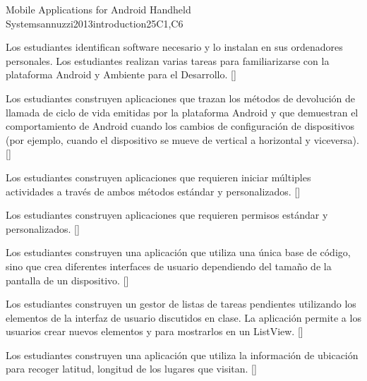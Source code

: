 \begin{syllabus}
\begin{unit}{Mobile Applications for Android Handheld Systems}{}{annuzzi2013introduction}{25}{C1,C6}
\begin{learningoutcomes}
    \item Los estudiantes identifican software necesario y lo instalan en sus ordenadores personales. 
          Los estudiantes realizan varias tareas para familiarizarse con la plataforma Android y Ambiente para el Desarrollo. [\Usage]
    \item Los estudiantes construyen aplicaciones que trazan los métodos de devolución de llamada de ciclo de 
          vida emitidas por la plataforma Android y que demuestran el comportamiento de Android cuando los cambios de configuración de 
          dispositivos (por ejemplo, cuando el dispositivo se mueve de vertical a horizontal y viceversa). [\Usage]
    \item Los estudiantes construyen aplicaciones que requieren iniciar múltiples actividades a través de ambos métodos estándar y personalizados. [\Usage]
    \item Los estudiantes construyen aplicaciones que requieren permisos estándar y personalizados. [\Usage]
    \item Los estudiantes construyen una aplicación que utiliza una única base de código, sino que crea diferentes interfaces de 
          usuario dependiendo del tamaño de la pantalla de un dispositivo. [\Usage]
    \item Los estudiantes construyen un gestor de listas de tareas pendientes utilizando los elementos de la interfaz de 
          usuario discutidos en clase. La aplicación permite a los usuarios crear nuevos elementos y para mostrarlos en un ListView. [\Usage]
    \item Los estudiantes construyen una aplicación que utiliza la información de ubicación para recoger latitud, longitud de los lugares que visitan. [\Usage]
\end{learningoutcomes}
\end{unit}




\begin{coursebibliography}
\end{coursebibliography}

\end{syllabus}
